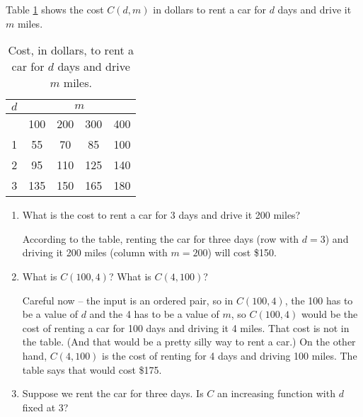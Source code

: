 \begin{example}
Table \ref{tab:4-1-rentcar} shows the cost $C(d,m)$ in dollars to rent a car for $d$ days and drive it $m$ miles.

\begin{table}[ht!]
\centering
    \begin{tabular}{*{5}{c}}
    $d$ & \multicolumn{4}{c}{$m$} \\
    \toprule
        & 100 & 200 & 300 & 400\\
    \midrule
    1   &  55 &  70 &  85 & 100\\	
    2   &  95 & 110 & 125 & 140\\	
    3   & 135 & 150 & 165 & 180\\
    \bottomrule
    \end{tabular}
    \caption{Cost, in dollars, to rent a car for $d$ days and drive $m$ miles.}
    \label{tab:4-1-rentcar}
\end{table}
\begin{enumerate}[label=(\alph*)]
    \item What is the cost to rent a car for 3 days and drive it 200 miles?

    \begin{solution} 
    According to the table, renting the car for three days (row with $d=3$) and driving it 200 miles (column with $m=200$) will cost \$150.
    \end{solution}
    \item What is $C(100,4)$? What is $C(4,100)$?

    \begin{solution} 
    Careful now -- the input is an ordered pair, so in $C(100,4)$, the 100 has to be a value of $d$ and the 4 has to be a value of $m$, so $C(100,4)$ would be the cost of renting a car for 100 days and driving it 4 miles. That cost is not in the table. (And that would be a pretty silly way to rent a car.) On the other hand, $C(4,100)$ is the cost of renting for 4 days and driving 100 miles. The table says that would cost \$175.
    \end{solution}
    \item Suppose we rent the car for three days. Is $C$ an increasing function with $d$ fixed at 3?


\end{enumerate}
\end{example}
